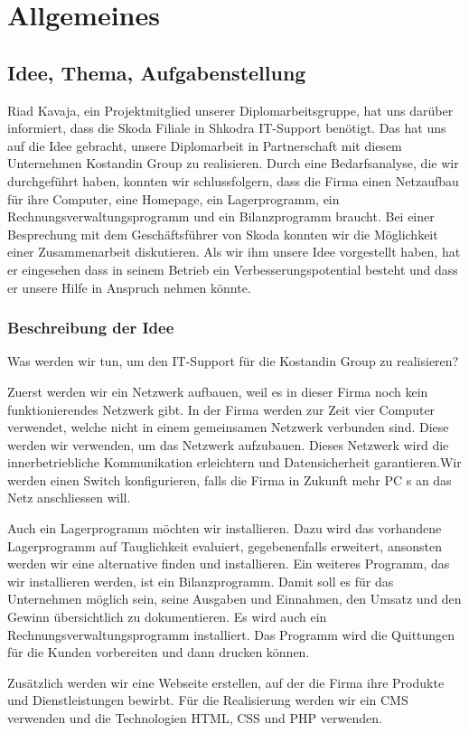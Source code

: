 \chapter{Allgemeines}
\section{Idee, Thema, Aufgabenstellung}

Riad Kavaja, ein Projektmitglied unserer Diplomarbeitsgruppe, hat uns dar\"uber informiert, dass die Skoda Filiale in Shkodra IT-Support ben\"otigt. Das hat uns auf die Idee gebracht, unsere Diplomarbeit in Partnerschaft mit diesem Unternehmen Kostandin Group zu realisieren.
Durch eine Bedarfsanalyse, die wir durchgef\"uhrt haben, konnten wir schlussfolgern, dass die Firma einen Netzaufbau f\"ur ihre Computer, eine Homepage, ein Lagerprogramm, ein Rechnungsverwaltungsprogramm und ein Bilanzprogramm braucht.
Bei einer Besprechung mit dem Gesch\"aftsf\"uhrer von Skoda konnten wir die M\"oglichkeit einer Zusammenarbeit diskutieren. Als wir ihm unsere Idee vorgestellt haben, hat er eingesehen dass in seinem Betrieb ein Verbesserungspotential besteht  und dass er unsere Hilfe in Anspruch nehmen k\"onnte.

\subsection{Beschreibung der Idee}

Was werden wir tun, um den IT-Support f\"ur die Kostandin Group zu realisieren?

Zuerst werden wir ein Netzwerk aufbauen, weil es in dieser Firma noch kein funktionierendes Netzwerk gibt.
In der Firma werden zur Zeit vier Computer verwendet, welche nicht in einem gemeinsamen Netzwerk verbunden sind. Diese werden wir verwenden, um das Netzwerk aufzubauen. Dieses Netzwerk wird die innerbetriebliche Kommunikation erleichtern und Datensicherheit garantieren.Wir werden einen Switch konfigurieren, falls die Firma in Zukunft mehr PC s an das Netz anschliessen will.

Auch ein Lagerprogramm m\"ochten wir installieren. Dazu wird das vorhandene Lagerprogramm auf Tauglichkeit evaluiert, gegebenenfalls erweitert, ansonsten werden wir eine alternative finden und installieren.
Ein weiteres Programm, das wir installieren werden, ist ein Bilanzprogramm. Damit soll es f\"ur das Unternehmen m\"oglich sein, seine Ausgaben und Einnahmen, den Umsatz und den Gewinn \"ubersichtlich zu dokumentieren.
Es wird auch ein Rechnungsverwaltungsprogramm installiert. Das Programm wird die Quittungen f\"ur die Kunden vorbereiten und dann drucken k\"onnen. 

Zus\"atzlich werden wir eine Webseite erstellen, auf der die Firma ihre Produkte und Dienstleistungen bewirbt. F\"ur die Realisierung werden wir ein CMS verwenden und die Technologien HTML, CSS und PHP verwenden.


